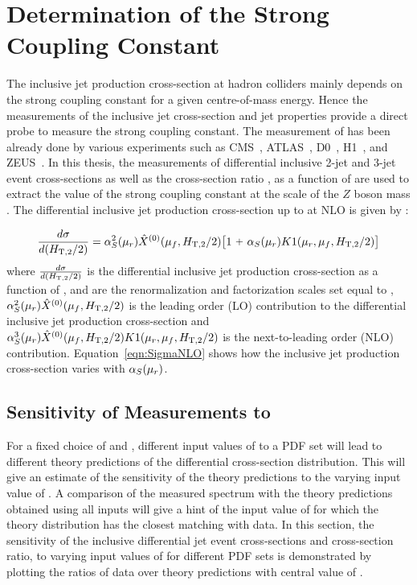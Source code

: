 \chapter{Determination of the Strong Coupling Constant}
\label{chap:Alphas}
The inclusive jet production cross-section at hadron colliders mainly depends on the strong coupling constant \alps for a given centre-of-mass energy. Hence the measurements of the inclusive jet cross-section and jet properties provide a direct probe to measure the strong coupling constant. The measurement of \alps has been already done by various experiments such as CMS~\cite{Chatrchyan:2013txa, Chatrchyan:2013haa, Khachatryan:2014waa, CMS:2014mna, Khachatryan:2016mlc}, ATLAS~\cite{ATLAS:2015yaa}, D0~\cite{Abazov:2009nc, Abazov:2012lua}, H1~\cite{Andreev:2014wwa, Andreev:2016tgi}, and ZEUS~\cite{Abramowicz:2012jz}. In this thesis, the measurements of differential inclusive 2-jet and 3-jet event cross-sections as well as the cross-section ratio \ratio, as a function of \httwo are used to extract the value of the strong coupling constant at the scale of the $Z$ boson mass \alpsmz. The differential inclusive jet production cross-section up to at NLO is given by \cite{Affolder:2001hn} :

 \begin{equation}
 \frac{d\sigma}{d(\httwo)} = \alpha_S^2(\mur)\hat{X}^{(0)}(\muf,\httwo)\big[1~\plus \alpha_S(\mur)K1(\mur, \muf,\httwo)\big]
 \label{eqn:SigmaNLO}
 \end{equation}
 where $\frac{d\sigma}{d(\httwo)}$ is the differential inclusive jet production cross-section as a function of \httwo, \mur and \muf are the renormalization and factorization scales set equal to \httwo, $\alpha_S^2(\mu_r)\hat{X}^{(0)}(\mu_f,H_{\mathrm{T,2}}/2)$ is the leading order (LO) contribution to the differential inclusive jet production cross-section and $\alpha_S^3(\mu_r)\hat{X}^{(0)}(\mu_f,H_{\mathrm{T,2}}/2)K1(\mu_r, \mu_f,H_{\mathrm{T,2}}/2)$ is the next-to-leading order (NLO) contribution. Equation~\ref{eqn:SigmaNLO} shows how the inclusive jet production cross-section varies with $\alpha_S(\mu_r)$. 
 
\section{Sensitivity of Measurements to \texorpdfstring{\alpsmz}{alpha-S(M(Z))}}
\label{sec:sensitivity}
 
For a fixed choice of \mur and \muf, different input values of \alpsmz to a PDF set will lead to different theory predictions of the differential cross-section distribution. This will give an estimate of the sensitivity of the theory predictions to the varying input value of \alpsmz. A comparison of the measured spectrum with the theory predictions obtained using all \alpsmz inputs will give a hint of the input value of \alpsmz for which the theory distribution has the closest matching with data. In this section, the sensitivity of the inclusive differential jet event cross-sections and cross-section ratio, \ratio to varying input values of \alpsmz for different PDF sets is demonstrated by plotting the ratios of data over theory predictions with central value of \alpsmz.

